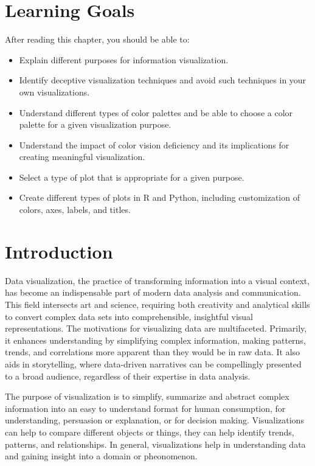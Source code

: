 %
%
\section*{Learning Goals}

After reading this chapter, you should be able to:
\begin{itemize}
   \item Explain different purposes for information visualization.
   \item Identify deceptive visualization techniques and avoid such techniques in your own visualizations.
   \item Understand different types of color palettes and be able to choose a color palette for a given visualization purpose.
   \item Understand the impact of color vision deficiency and its implications for creating meaningful visualization.
   \item Select a type of plot that is appropriate for a given purpose.
   \item Create different types of plots in R and Python, including customization of colors, axes, labels, and titles.
\end{itemize}

\section{Introduction}

Data visualization, the practice of transforming information into a visual context, has become an indispensable part of modern data analysis and communication. This field intersects art and science, requiring both creativity and analytical skills to convert complex data sets into comprehensible, insightful visual representations. The motivations for visualizing data are multifaceted. Primarily, it enhances understanding by simplifying complex information, making patterns, trends, and correlations more apparent than they would be in raw data. It also aids in storytelling, where data-driven narratives can be compellingly presented to a broad audience, regardless of their expertise in data analysis.

The purpose of visualization is to simplify, summarize and abstract complex information into an easy to understand format for human consumption, for understanding, persuasion or explanation, or for decision making. Visualizations can help to compare different objects or things, they can help identify trends, patterns, and relationships. In general, visualizations help in understanding data and gaining insight into a domain or pheonomenon.

